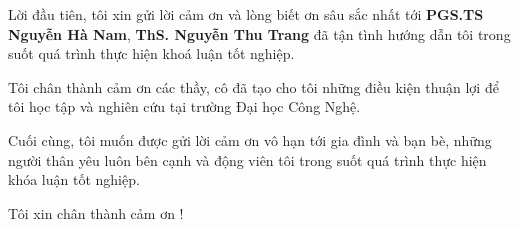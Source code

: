 

\begin{acknowledgements}      %

\indent Lời đầu tiên, tôi xin gửi lời cảm ơn và lòng biết ơn sâu sắc nhất tới \textbf{PGS.TS Nguyễn Hà Nam}, \textbf{ThS. Nguyễn Thu Trang} đã tận tình hướng dẫn tôi trong suốt quá trình thực hiện khoá luận tốt nghiệp.  

\indent Tôi chân thành cảm ơn các thầy, cô đã tạo cho tôi những điều kiện thuận lợi để 
tôi học tập và nghiên cứu tại trường Đại học Công Nghệ.  
 
\indent Cuối cùng, tôi muốn được gửi lời cảm ơn vô hạn tới gia  đình và bạn bè, những 
người thân yêu luôn bên cạnh và động viên tôi trong suốt quá trình thực hiện khóa luận 
tốt nghiệp.  

\indent Tôi xin chân thành cảm ơn ! 
\end{acknowledgements}



